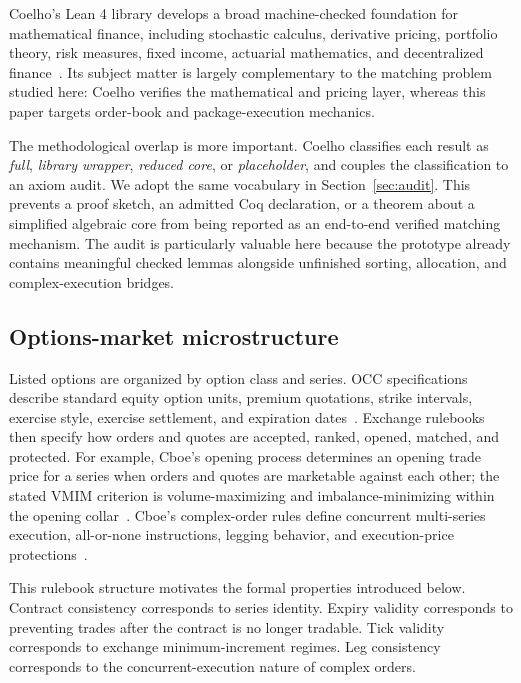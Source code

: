 \documentclass[11pt]{article}
\begin{document}
Coelho's Lean 4 library develops a broad machine-checked foundation for mathematical finance, including stochastic calculus, derivative pricing, portfolio theory, risk measures, fixed income, actuarial mathematics, and decentralized finance~\cite{Coelho2026}. Its subject matter is largely complementary to the matching problem studied here: Coelho verifies the mathematical and pricing layer, whereas this paper targets order-book and package-execution mechanics.

The methodological overlap is more important. Coelho classifies each result as \emph{full}, \emph{library wrapper}, \emph{reduced core}, or \emph{placeholder}, and couples the classification to an axiom audit. We adopt the same vocabulary in Section~\ref{sec:audit}. This prevents a proof sketch, an admitted Coq declaration, or a theorem about a simplified algebraic core from being reported as an end-to-end verified matching mechanism. The audit is particularly valuable here because the prototype already contains meaningful checked lemmas alongside unfinished sorting, allocation, and complex-execution bridges.

\subsection{Options-market microstructure}

Listed options are organized by option class and series. OCC specifications describe standard equity option units, premium quotations, strike intervals, exercise style, exercise settlement, and expiration dates~\cite{OCCEquityOptions}. Exchange rulebooks then specify how orders and quotes are accepted, ranked, opened, matched, and protected. For example, Cboe's opening process determines an opening trade price for a series when orders and quotes are marketable against each other; the stated VMIM criterion is volume-maximizing and imbalance-minimizing within the opening collar~\cite{CboeRuleBook}. Cboe's complex-order rules define concurrent multi-series execution, all-or-none instructions, legging behavior, and execution-price protections~\cite{CboeRuleBook}.

This rulebook structure motivates the formal properties introduced below. Contract consistency corresponds to series identity. Expiry validity corresponds to preventing trades after the contract is no longer tradable. Tick validity corresponds to exchange minimum-increment regimes. Leg consistency corresponds to the concurrent-execution nature of complex orders.
\end{document}
